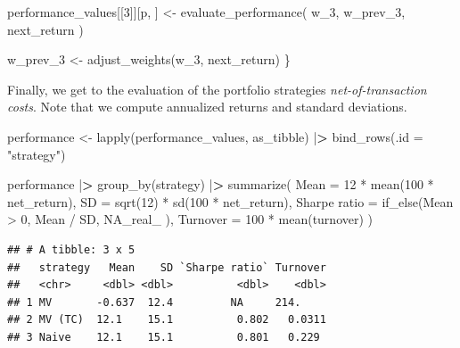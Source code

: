 \documentclass[
]{krantz}
\newenvironment{Shaded}{\begin{snugshade}}{\end{snugshade}}
\newcommand{\AttributeTok}[1]{\textcolor[rgb]{0.61,0.61,0.61}{#1}}
\newcommand{\ConstantTok}[1]{\textcolor[rgb]{0,0,0}{#1}}
\newcommand{\DecValTok}[1]{\textcolor[rgb]{0.06,0.06,0.06}{#1}}
\newcommand{\ErrorTok}[1]{\textcolor[rgb]{0.14,0.14,0.14}{\textbf{#1}}}
\newcommand{\FunctionTok}[1]{\textcolor[rgb]{0,0,0}{#1}}
\newcommand{\NormalTok}[1]{#1}
\newcommand{\OtherTok}[1]{\textcolor[rgb]{0.37,0.37,0.37}{#1}}
\newcommand{\SpecialCharTok}[1]{\textcolor[rgb]{0,0,0}{#1}}
\newcommand{\StringTok}[1]{\textcolor[rgb]{0.5,0.5,0.5}{#1}}
\begin{document}
\begin{Shaded}
\begin{Highlighting}[]
\NormalTok{  performance\_values[[}\DecValTok{3}\NormalTok{]][p, ] }\OtherTok{\textless{}{-}} \FunctionTok{evaluate\_performance}\NormalTok{(}
\NormalTok{    w\_3,}
\NormalTok{    w\_prev\_3,}
\NormalTok{    next\_return}
\NormalTok{  )}

\NormalTok{  w\_prev\_3 }\OtherTok{\textless{}{-}} \FunctionTok{adjust\_weights}\NormalTok{(w\_3, next\_return)}
\NormalTok{\}}
\end{Highlighting}
\end{Shaded}

Finally, we get to the evaluation of the portfolio strategies \emph{net-of-transaction costs}. Note that we compute annualized returns and standard deviations.

\begin{Shaded}
\begin{Highlighting}[]
\NormalTok{performance }\OtherTok{\textless{}{-}} \FunctionTok{lapply}\NormalTok{(performance\_values, as\_tibble) }\SpecialCharTok{|}\ErrorTok{\textgreater{}}
  \FunctionTok{bind\_rows}\NormalTok{(}\AttributeTok{.id =} \StringTok{"strategy"}\NormalTok{)}

\NormalTok{performance }\SpecialCharTok{|}\ErrorTok{\textgreater{}}
  \FunctionTok{group\_by}\NormalTok{(strategy) }\SpecialCharTok{|}\ErrorTok{\textgreater{}}
  \FunctionTok{summarize}\NormalTok{(}
    \AttributeTok{Mean =} \DecValTok{12} \SpecialCharTok{*} \FunctionTok{mean}\NormalTok{(}\DecValTok{100} \SpecialCharTok{*}\NormalTok{ net\_return),}
    \AttributeTok{SD =} \FunctionTok{sqrt}\NormalTok{(}\DecValTok{12}\NormalTok{) }\SpecialCharTok{*} \FunctionTok{sd}\NormalTok{(}\DecValTok{100} \SpecialCharTok{*}\NormalTok{ net\_return),}
    \StringTok{\textasciigrave{}}\AttributeTok{Sharpe ratio}\StringTok{\textasciigrave{}} \OtherTok{=} \FunctionTok{if\_else}\NormalTok{(Mean }\SpecialCharTok{\textgreater{}} \DecValTok{0}\NormalTok{,}
\NormalTok{      Mean }\SpecialCharTok{/}\NormalTok{ SD,}
      \ConstantTok{NA\_real\_}
\NormalTok{    ),}
    \AttributeTok{Turnover =} \DecValTok{100} \SpecialCharTok{*} \FunctionTok{mean}\NormalTok{(turnover)}
\NormalTok{  )}
\end{Highlighting}
\end{Shaded}

\begin{verbatim}
## # A tibble: 3 x 5
##   strategy   Mean    SD `Sharpe ratio` Turnover
##   <chr>     <dbl> <dbl>          <dbl>    <dbl>
## 1 MV       -0.637  12.4         NA     214.    
## 2 MV (TC)  12.1    15.1          0.802   0.0311
## 3 Naive    12.1    15.1          0.801   0.229
\end{verbatim}
\end{document}
